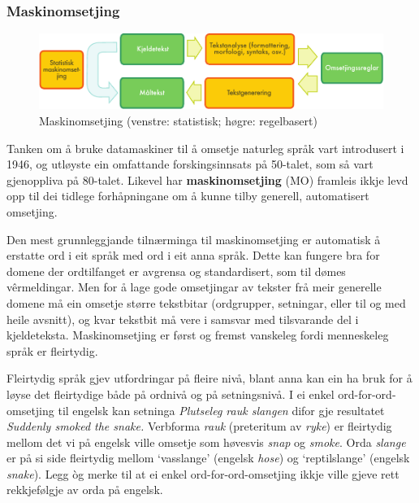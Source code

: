 \begin{multicols}{2}
\subsubsection{Maskinomsetjing}

\begin{figure}[htb]
  \center
  \includegraphics[width=\textwidth]{../_media/norwegian-nynorsk/machine_translation}
  \caption{Maskinomsetjing (venstre: statistisk; høgre: regelbasert)}
  \label{fig:mtarch_no}
\end{figure}

Tanken om å bruke datamaskiner til å omsetje naturleg språk vart introdusert i 1946, og utløyste ein omfattande forskingsinnsats på 50-talet, som så vart gjenoppliva på 80-talet. Likevel har \textbf{maskinomsetjing} (MO) framleis ikkje levd opp til dei tidlege forhåpningane om å kunne tilby generell, automatisert omsetjing.


Den mest grunnleggjande tilnærminga til maskinomsetjing er automatisk å erstatte ord i eit språk med ord i eit anna språk. Dette kan fungere bra for domene der ordtilfanget er avgrensa og standardisert, som til dømes vêrmeldingar. Men for å lage gode omsetjingar av tekster frå meir generelle domene må ein omsetje større tekstbitar (ordgrupper, setningar, eller til og med heile avsnitt), og kvar tekstbit må vere i samsvar med tilsvarande del i kjeldeteksta. Maskinomsetjing er først og fremst vanskeleg fordi menneskeleg språk er fleirtydig. 

Fleirtydig språk gjev utfordringar på fleire nivå, blant anna kan ein ha bruk for å løyse det fleirtydige både på ordnivå og på setningsnivå. 
I ei enkel ord-for-ord-omsetjing til engelsk kan setninga \textit{Plutseleg rauk slangen} difor gje resultatet \textit{Suddenly smoked the snake.}
Verbforma \textit{rauk} (preteritum av \textit{ryke}) er fleirtydig mellom det vi på engelsk ville omsetje som høvesvis \textit{snap} og \textit{smoke}.
Orda \textit{slange} er på si side fleirtydig mellom `vasslange' (engelsk \textit{hose}) og `reptilslange' (engelsk \textit{snake}). Legg òg merke til at ei enkel ord-for-ord-omsetjing ikkje ville gjeve rett rekkjefølgje av orda på engelsk.


\end{multicols}
